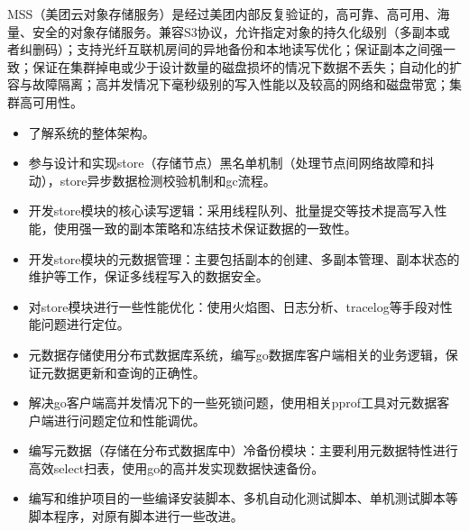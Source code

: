 \documentclass{resume}
\begin{document}
MSS（美团云对象存储服务）是经过美团内部反复验证的，高可靠、高可用、海量、安全的对象存储服务。兼容S3协议，允许指定对象的持久化级别（多副本或者纠删码）；支持光纤互联机房间的异地备份和本地读写优化；保证副本之间强一致；保证在集群掉电或少于设计数量的磁盘损坏的情况下数据不丢失；自动化的扩容与故障隔离；高并发情况下毫秒级别的写入性能以及较高的网络和磁盘带宽；集群高可用性。
\begin{itemize}
  \item 了解系统的整体架构。
  \item 参与设计和实现store（存储节点）黑名单机制（处理节点间网络故障和抖动），store异步数据检测校验机制和gc流程。
  \item 开发store模块的核心读写逻辑：采用线程队列、批量提交等技术提高写入性能，使用强一致的副本策略和冻结技术保证数据的一致性。
  \item 开发store模块的元数据管理：主要包括副本的创建、多副本管理、副本状态的维护等工作，保证多线程写入的数据安全。
  \item 对store模块进行一些性能优化：使用火焰图、日志分析、tracelog等手段对性能问题进行定位。
  \item 元数据存储使用分布式数据库系统，编写go数据库客户端相关的业务逻辑，保证元数据更新和查询的正确性。
  \item 解决go客户端高并发情况下的一些死锁问题，使用相关pprof工具对元数据客户端进行问题定位和性能调优。
  \item 编写元数据（存储在分布式数据库中）冷备份模块：主要利用元数据特性进行高效select扫表，使用go的高并发实现数据快速备份。
  \item 编写和维护项目的一些编译安装脚本、多机自动化测试脚本、单机测试脚本等脚本程序，对原有脚本进行一些改进。
\end{itemize}

\end{document}
